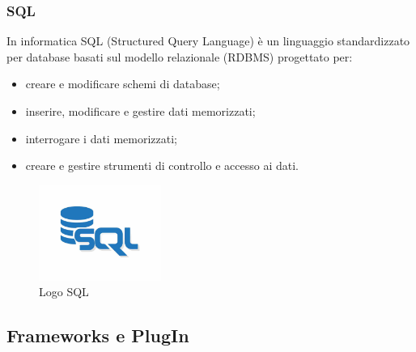 \subsubsection{SQL}
In informatica SQL (Structured Query Language) è un linguaggio standardizzato per database basati sul modello relazionale (RDBMS) progettato per:
\begin{itemize}
    \item creare e modificare schemi di database;
    
    \item inserire, modificare e gestire dati memorizzati;
    
    \item interrogare i dati memorizzati;
    
    \item creare e gestire strumenti di controllo e accesso ai dati.
\end{itemize}
\begin{figure}[!h] 
    \centering 
    \includegraphics[width=4cm]{immagini/loghi/sql.jpg}
    \caption{Logo SQL}
\end{figure}
\newpage
\subsection{Frameworks e PlugIn}

